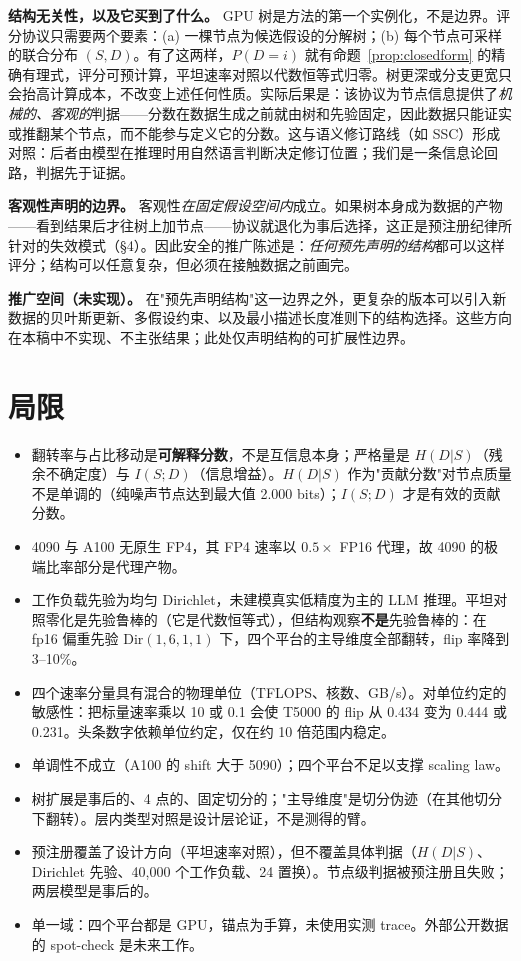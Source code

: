 \documentclass[10pt]{article}
\providecommand{\tightlist}{\relax}
\begin{document}
\textbf{结构无关性，以及它买到了什么。} GPU 树是方法的第一个实例化，不是边界。评分协议只需要两个要素：(a) 一棵节点为候选假设的分解树；(b) 每个节点可采样的联合分布 $(S,D)$。有了这两样，$P(D=i)$ 就有命题~\ref{prop:closedform} 的精确有理式，评分可预计算，平坦速率对照以代数恒等式归零。树更深或分支更宽只会抬高计算成本，不改变上述任何性质。实际后果是：该协议为节点信息提供了\emph{机械的、客观的}判据——分数在数据生成之前就由树和先验固定，因此数据只能证实或推翻某个节点，而不能参与定义它的分数。这与语义修订路线（如 SSC）形成对照：后者由模型在推理时用自然语言判断决定修订位置；我们是一条信息论回路，判据先于证据。

\textbf{客观性声明的边界。} 客观性\emph{在固定假设空间内}成立。如果树本身成为数据的产物——看到结果后才往树上加节点——协议就退化为事后选择，这正是预注册纪律所针对的失效模式（§4）。因此安全的推广陈述是：\emph{任何预先声明的结构}都可以这样评分；结构可以任意复杂，但必须在接触数据之前画完。

\textbf{推广空间（未实现）。} 在"预先声明结构"这一边界之外，更复杂的版本可以引入新数据的贝叶斯更新、多假设约束、以及最小描述长度准则下的结构选择。这些方向在本稿中不实现、不主张结果；此处仅声明结构的可扩展性边界。

\section{局限}\label{limitations}

\begin{itemize}
\tightlist
\item
  翻转率与占比移动是\textbf{可解释分数}，不是互信息本身；严格量是 $H(D|S)$（残余不确定度）与 $I(S;D)$（信息增益）。$H(D|S)$ 作为"贡献分数"对节点质量不是单调的（纯噪声节点达到最大值 2.000 bits）；$I(S;D)$ 才是有效的贡献分数。
\item
  4090 与 A100 无原生 FP4，其 FP4 速率以 $0.5\times$ FP16 代理，故 4090 的极端比率部分是代理产物。
\item
  工作负载先验为均匀 Dirichlet，未建模真实低精度为主的 LLM 推理。平坦对照零化是先验鲁棒的（它是代数恒等式），但结构观察\textbf{不是}先验鲁棒的：在 fp16 偏重先验 $\mathrm{Dir}(1,6,1,1)$ 下，四个平台的主导维度全部翻转，flip 率降到 3--10\%。
\item
  四个速率分量具有混合的物理单位（TFLOPS、核数、GB/s）。对单位约定的敏感性：把标量速率乘以 10 或 0.1 会使 T5000 的 flip 从 0.434 变为 0.444 或 0.231。头条数字依赖单位约定，仅在约 10 倍范围内稳定。
\item
  单调性不成立（A100 的 shift 大于 5090）；四个平台不足以支撑 scaling law。
\item
  树扩展是事后的、4 点的、固定切分的；"主导维度"是切分伪迹（在其他切分下翻转）。层内类型对照是设计层论证，不是测得的臂。
\item
  预注册覆盖了设计方向（平坦速率对照），但不覆盖具体判据（$H(D|S)$、Dirichlet 先验、40,000 个工作负载、24 置换）。节点级判据被预注册且失败；两层模型是事后的。
\item
  单一域：四个平台都是 GPU，锚点为手算，未使用实测 trace。外部公开数据的 spot-check 是未来工作。
\end{itemize}
\end{document}
